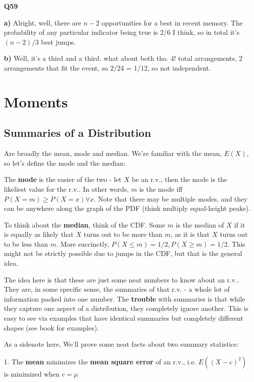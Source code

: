 \documentclass{article}
\begin{document}
		\textbf{Q59}
		
			\textbf{a)} Alright, well, there are $n-2$ opportunities for a best in recent memory. The probability of any particular indicator being true is $2/6$ I think, so in total it's $(n-2)/3$ best jumps.
			
			\textbf{b)} Well, it's a third and a third. what about both tho. 4! total arrangements, 2 arrangements that fit the event, so 2/24 = 1/12, so not independent.
	
\newpage		
\section{Moments}
	
	\subsection{Summaries of a Distribution}
	
		Are broadly the mean, mode and median. We're familiar with the mean, $E(X)$, so let's define the mode and the median:
		
		The \textbf{mode} is the easier of the two - let $X$ be an r.v., then the mode is the likeliest value for the r.v.. In other words, $m$ is the mode iff $P(X = m) \ge P(X = x) \forall x$. Note that there may be multiple modes, and they can be anywhere along the graph of the PDF (think multiply equal-height peaks).
		
		To think about the \textbf{median}, think of the CDF. Some $m$ is the median of $X$ if it is equally as likely that $X$ turns out to be more than $m$, as it is that $X$ turns out to be less than $m$. More succinctly, $P(X \le m) = 1/2, P(X\ge m) = 1/2$. This might not be strictly possible due to jumps in the CDF, but that is the general idea.
		
		The idea here is that these are just some neat numbers to know about an r.v.. They are, in some specific sense, the summaries of that r.v. - a whole lot of information packed into one number. The \textbf{trouble} with summaries is that while they capture one aspect of a distribution, they completely ignore another. This is easy to see via examples that have identical summaries but completely different shapes (see book for examples).
		
		As a sidenote here, We'll prove some neat facts about two summary statistics:
		
		1. The \textbf{mean} minimizes the \textbf{mean square error} of an r.v., i.e. $E((X-c)^2)$ is minimized when $c = \mu$
		
\end{document}
